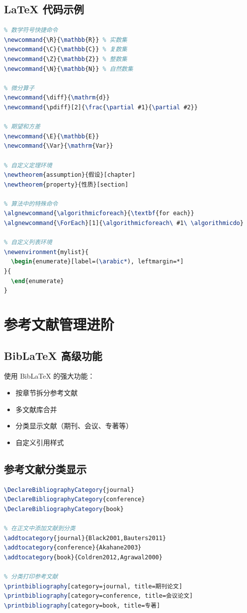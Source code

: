 \subsection{LaTeX 代码示例}
\begin{lstlisting}[language=TeX, caption=LaTeX自定义命令示例]
% 在 mynudt.sty 中添加自定义命令
% 数学符号快捷命令
\newcommand{\R}{\mathbb{R}} % 实数集
\newcommand{\C}{\mathbb{C}} % 复数集
\newcommand{\Z}{\mathbb{Z}} % 整数集
\newcommand{\N}{\mathbb{N}} % 自然数集

% 微分算子
\newcommand{\diff}{\mathrm{d}}
\newcommand{\pdiff}[2]{\frac{\partial #1}{\partial #2}}

% 期望和方差
\newcommand{\E}{\mathbb{E}}
\newcommand{\Var}{\mathrm{Var}}

% 自定义定理环境
\newtheorem{assumption}{假设}[chapter]
\newtheorem{property}{性质}[section]

% 算法中的特殊命令
\algnewcommand{\algorithmicforeach}{\textbf{for each}}
\algnewcommand{\ForEach}[1]{\algorithmicforeach\ #1\ \algorithmicdo}

% 自定义列表环境
\newenvironment{mylist}{
  \begin{enumerate}[label=(\arabic*), leftmargin=*]
}{
  \end{enumerate}
}
\end{lstlisting}

\section{参考文献管理进阶}
\label{sec:bib_adv}

\subsection{BibLaTeX 高级功能}
使用 BibLaTeX 的强大功能：

\begin{itemize}
  \item 按章节拆分参考文献
  \item 多文献库合并
  \item 分类显示文献（期刊、会议、专著等）
  \item 自定义引用样式
\end{itemize}

\subsection{参考文献分类显示}
\begin{lstlisting}[language=TeX, caption=分类显示参考文献]
% 在导言区添加
\DeclareBibliographyCategory{journal}
\DeclareBibliographyCategory{conference}
\DeclareBibliographyCategory{book}

% 在正文中添加文献到分类
\addtocategory{journal}{Black2001,Bauters2011}
\addtocategory{conference}{Akahane2003}
\addtocategory{book}{Coldren2012,Agrawal2000}

% 分类打印参考文献
\printbibliography[category=journal, title=期刊论文]
\printbibliography[category=conference, title=会议论文]
\printbibliography[category=book, title=专著]
\end{lstlisting}

